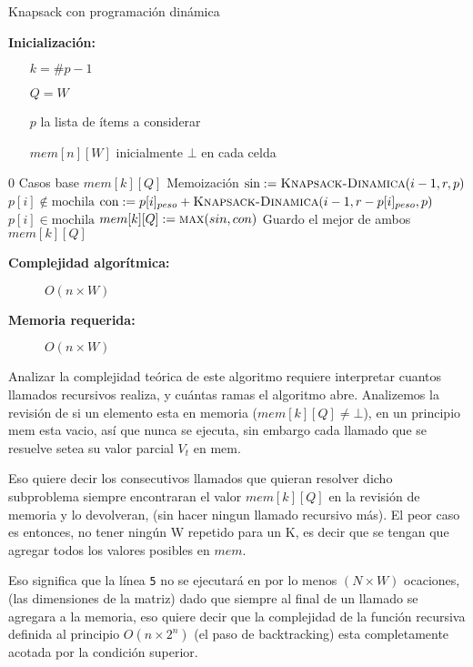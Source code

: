\documentclass[fleqn, 11pt]{article}
\begin{document}
\begin{algorithm}
\caption{Knapsack con programación dinámica}
\begin{algorithmic}[1]
\item[\textbf{Inicialización:}]
\item[] \begin{itemize}
	\item[] $k = \#p - 1$
	\item[] $Q = W$
	\item[] $p$ la lista de ítems a considerar
	\item[] $mem[n][W]$ inicialmente $\bot$ en cada celda
\end{itemize}
\Statex
{}
	\State \Return $0$
\Comment Casos base
\EndIf
	\State	\Return $mem[k][Q]$
	\Comment Memoización
\EndIf
\State $\text{sin} := \Call{Knapsack-Dinamica}{i - 1, r, p}$
\Comment $p[i] \not \in \text{mochila}$
	\State $\text{con} := p[i]_{peso} + \Call{Knapsack-Dinamica}{i - 1, r - p[i]_{peso}, p}$
\Comment $p[i] \in \text{mochila}$
\State $mem[k][Q] := \Call{max}{sin, con}$
\Comment Guardo el mejor de ambos
\State \Return $mem[k][Q]$
\EndFunction
\end{algorithmic}
\begin{description}
	\item[\textbf{Complejidad algorítmica:}] $O(n \times W)$
	\item[\textbf{Memoria requerida:}] $O(n \times W)$
\end{description}
\end{algorithm}

Analizar la complejidad teórica de este algoritmo requiere interpretar cuantos
llamados recursivos realiza, y cuántas ramas el algoritmo abre. Analizemos la
revisión de si un elemento esta en memoria ($mem[k][Q] \neq \bot$), en un
principio mem esta vacio,  así que nunca se ejecuta, sin embargo cada llamado
que se resuelve setea su valor parcial \textit{$V_t$} en mem.

Eso quiere decir los consecutivos llamados que quieran resolver dicho
subproblema siempre encontraran el valor $mem[k][Q]$ en la revisión de memoria
y lo devolveran, (sin hacer ningun llamado recursivo más). El peor caso es
entonces, no tener ningún W repetido para un K, es decir que se tengan que
agregar todos los valores posibles en $mem$.

Eso significa que la línea \texttt{5} no se ejecutará en por lo menos $(N
\times W)$ ocaciones, (las dimensiones de la matriz) dado que siempre al final
de un llamado se agregara a la memoria, eso quiere decir que la complejidad de
la función recursiva definida al principio $O(n \times 2^n)$ (el paso de
backtracking) esta completamente acotada por la condición superior.
\end{document}
